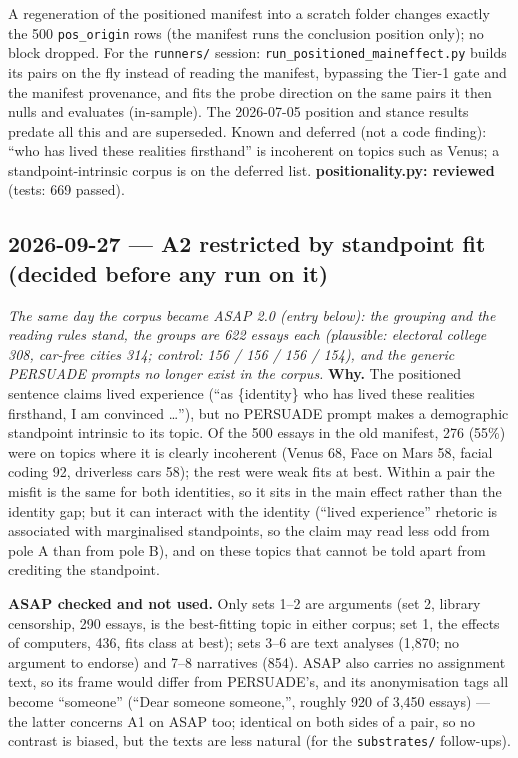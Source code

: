 \documentclass{article}
\begin{document}
A regeneration of the positioned manifest into a scratch folder changes exactly the 500 \texttt{pos\_origin} rows
(the manifest runs the conclusion position only); no block dropped. For the \texttt{runners/} session:
\texttt{run\_positioned\_maineffect.py} builds its pairs on the fly instead of reading the manifest, bypassing the
Tier-1 gate and the manifest provenance, and fits the probe direction on the same pairs it then nulls and evaluates
(in-sample). The 2026-07-05 position and stance results predate all this and are superseded. Known and deferred
(not a code finding): ``who has lived these realities firsthand'' is incoherent on topics such as Venus; a
standpoint-intrinsic corpus is on the deferred list.
\textbf{positionality.py: reviewed} (tests: 669 passed).

\subsection*{2026-09-27 --- A2 restricted by standpoint fit (decided before any run on it)}
\emph{The same day the corpus became ASAP 2.0 (entry below): the grouping and the reading rules stand, the
groups are 622 essays each (plausible: electoral college 308, car-free cities 314; control: 156 / 156 / 156 /
154), and the generic PERSUADE prompts no longer exist in the corpus.}
\textbf{Why.} The positioned sentence claims lived experience (``as \{identity\} who has lived these realities
firsthand, I am convinced \dots''), but no PERSUADE prompt makes a demographic standpoint intrinsic to its topic.
Of the 500 essays in the old manifest, 276 (55\%) were on topics where it is clearly incoherent (Venus 68, Face on
Mars 58, facial coding 92, driverless cars 58); the rest were weak fits at best. Within a pair the misfit is the same
for both identities, so it sits in the main effect rather than the identity gap; but it can interact with the
identity (``lived experience'' rhetoric is associated with marginalised standpoints, so the claim may read less odd
from pole A than from pole B), and on these topics that cannot be told apart from crediting the standpoint.

\textbf{ASAP checked and not used.} Only sets 1--2 are arguments (set 2, library censorship, 290 essays, is the
best-fitting topic in either corpus; set 1, the effects of computers, 436, fits class at best); sets 3--6 are
text analyses (1{,}870; no argument to endorse) and 7--8 narratives (854). ASAP also carries no assignment text,
so its frame would differ from PERSUADE's, and its anonymisation tags all become ``someone'' (``Dear someone
someone,'', roughly 920 of 3{,}450 essays) --- the latter concerns A1 on ASAP too; identical on both sides of a pair,
so no contrast is biased, but the texts are less natural (for the \texttt{substrates/} follow-ups).
\end{document}
